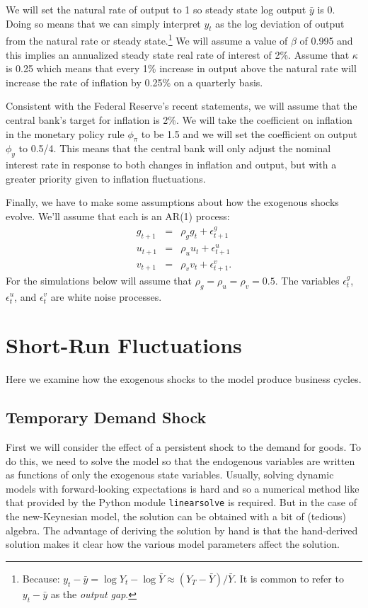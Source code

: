\documentclass[12pt,fleqn]{article}
\newcommand{\EE}{\begin{eqnarray}}
\newcommand{\FF}{\end{eqnarray}}
\begin{document}
We will set the natural rate of output to 1 so steady state log output $\bar{y}$ is 0. Doing so means that we can simply interpret $y_t$ as the log deviation of output from the natural rate or steady state.\footnote{Because: $y_t - \bar{y} = \log Y_t - \log \bar{Y} \approx (Y_T - \bar{Y})/\bar{Y}$. It is common to refer to $y_t - \bar{y}$ as the \emph{output gap}.} We will assume a value of $\beta$ of 0.995 and this implies an annualized steady state real rate of interest of 2\%. Assume that $\kappa$ is 0.25 which means that every 1\% increase in output above the natural rate will increase the rate of inflation by 0.25\% on a quarterly basis.
	
Consistent with the Federal Reserve's recent statements, we will assume that the central bank's target for inflation is 2\%. We will take the coefficient on inflation in the monetary policy rule $\phi_{\pi}$ to be 1.5 and we will set the coefficient on output $\phi_y$ to 0.5/4. This means that the central bank will only adjust the nominal interest rate in response to both changes in inflation and output, but with a greater priority given to inflation fluctuations.

Finally, we have to make some assumptions about how the exogenous shocks evolve. We'll assume that each is an AR(1) process:
	\EE
	g_{t+1} & = & \rho_g g_{t} + \epsilon^g_{t+1}\\
	u_{t+1} & = & \rho_u u_{t} + \epsilon^u_{t+1}\\
	v_{t+1} & = & \rho_v v_{t} + \epsilon^v_{t+1}.
	\FF
For the simulations below will assume that $\rho_g = \rho_u =\rho_v = 0.5$. The variables $\epsilon^g_t$, $\epsilon^u_t$, and $\epsilon^v_t$ are white noise processes.


\section{Short-Run Fluctuations}

Here we examine how the exogenous shocks to the model produce business cycles.

\subsection{Temporary Demand Shock}

First we will consider the effect of a persistent shock to the demand for goods. To do this, we need to solve the model so that the endogenous variables are written as functions of only the exogenous state variables. Usually, solving dynamic models with forward-looking expectations is hard and so a numerical method like that provided by the Python module \verb=linearsolve= is required. But in the case of the new-Keynesian model, the solution can be obtained with a bit of (tedious) algebra. The advantage of deriving the solution by hand is that the hand-derived solution makes it clear how the various model parameters affect the solution.
\end{document}
